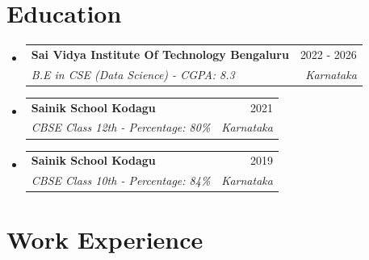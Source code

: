 \documentclass[letterpaper,11pt]{article}
\makeatletter
\newcommand{\resumeSubheading}[4]{
  \vspace{-2pt}\item
    \begin{tabular*}{0.97\textwidth}[t]{l@{\extracolsep{\fill}}r}
      \textbf{#1} & #2 \\
      \textit{\small#3} & \textit{\small #4} \\
    \end{tabular*}\vspace{-7pt}
}
\newcommand{\resumeSubHeadingListStart}{\begin{itemize}[leftmargin=0.15in, label={}]}
\newcommand{\resumeSubHeadingListEnd}{\end{itemize}\vspace{-10pt}}
\makeatother
\begin{document}
\section{Education}
  \resumeSubHeadingListStart
    \resumeSubheading
      {Sai Vidya Institute Of Technology Bengaluru}{2022 - 2026}
      {B.E in CSE (Data Science) - CGPA: 8.3}{Karnataka}
      
    \vspace{2pt}
      
    \resumeSubheading
      {Sainik School Kodagu}{2021 }
      {CBSE Class 12th - Percentage: 80\%}{Karnataka}

    \vspace{2pt}

    \resumeSubheading
      {Sainik School Kodagu}{2019 }
      {CBSE Class 10th - Percentage: 84\%}{Karnataka}
  \resumeSubHeadingListEnd
\vspace{1mm}



\section{Work Experience}
\justifying
\end{document}
